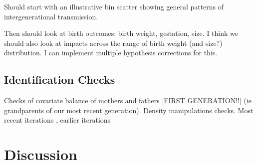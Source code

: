 \documentclass[11pt]{article}
\begin{document}
\begin{spacing}{1.5}
  Should start with an illustrative bin scatter \citep{Cattaneoetal2019} showing general patterns of intergenerational transmission.

  Then should look at birth outcomes: birth weight, gestation, size.  I think we should also look at impacts across the range of birth weight (and size?) distribution.  I can implement multiple hypothesis corrections for this.

  \subsection{Identification Checks}
  Checks of covariate balance of mothers and fathers [FIRST GENERATION!!]  (ie grandparents of our most recent generation).  Density manipulations checks.  Most recent iterations \citep{Cattaneoetal2020}, earlier iterations \citet{McCrary2008}

  

  
  \clearpage
  \section{Discussion}

  \clearpage
  \end{spacing}
  
  
\end{document}
